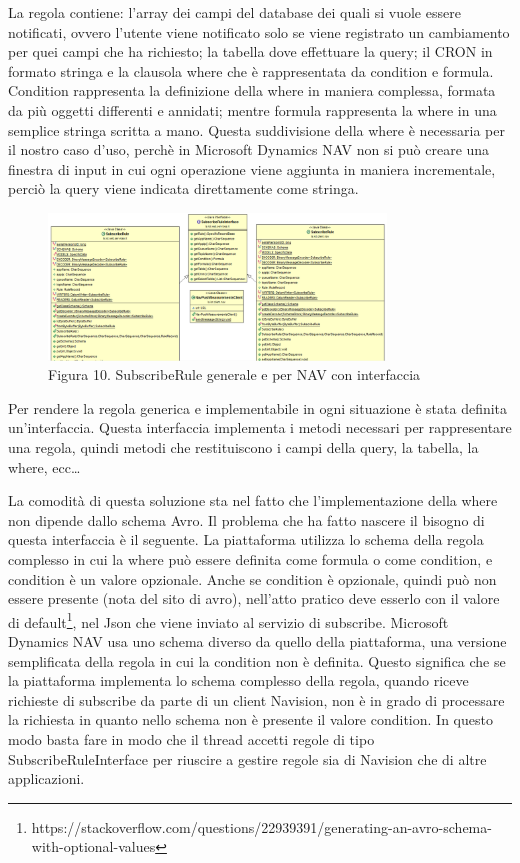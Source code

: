 La regola contiene: l’array dei campi del database dei quali si vuole essere notificati, ovvero l’utente viene notificato solo se viene registrato un cambiamento per quei campi che ha richiesto; la tabella dove effettuare la query; il CRON in formato stringa e la clausola where che è rappresentata da condition e formula. Condition rappresenta la definizione della where in maniera complessa, formata da più oggetti differenti e annidati; mentre formula rappresenta la where in una semplice stringa scritta a mano. Questa suddivisione della where è necessaria per il nostro caso d’uso, perchè in Microsoft Dynamics NAV non si può creare una finestra di input in cui ogni operazione viene aggiunta in maniera incrementale, perciò la query viene indicata direttamente come stringa.
\par \vspace*{2em}
\begin{figure}[h]
	\centering
	\includegraphics[width=0.8\textwidth]{rules.png}
	\caption*{Figura 10. SubscribeRule generale e per NAV con interfaccia}
\end{figure}
Per rendere la regola generica e implementabile in ogni situazione è stata definita un’interfaccia. Questa interfaccia implementa i metodi necessari per rappresentare una regola, quindi metodi che restituiscono i campi della query, la tabella, la where, ecc…
\par
La comodità di questa soluzione sta nel fatto che l’implementazione della where non dipende dallo schema Avro. Il problema che ha fatto nascere il bisogno di questa interfaccia è il seguente. La piattaforma utilizza lo schema della regola complesso in cui la where può essere definita come formula o come condition, e condition è un valore opzionale. Anche se condition è opzionale, quindi può non essere presente (nota del sito di avro), nell’atto pratico deve esserlo con il valore di default\footnote{https://stackoverflow.com/questions/22939391/generating-an-avro-schema-with-optional-values}, nel Json che viene inviato al servizio di subscribe. Microsoft Dynamics NAV usa uno schema diverso da quello della piattaforma, una versione semplificata della regola in cui la condition non è definita. Questo significa che se la piattaforma implementa lo schema complesso della regola, quando riceve richieste di subscribe da parte di un client Navision, non è in grado di processare la richiesta in quanto nello schema non è presente il valore condition. In questo modo basta fare in modo che il thread accetti regole di tipo SubscribeRuleInterface per riuscire a gestire regole sia di Navision che di altre applicazioni.
